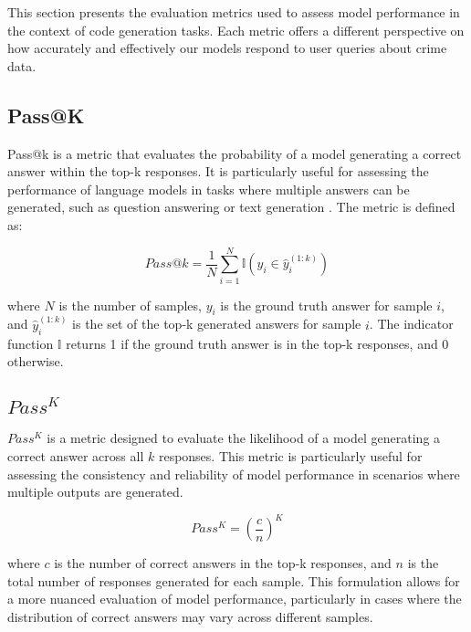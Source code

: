 This section presents the evaluation metrics used to assess model performance in the context of code generation tasks. Each metric offers a different perspective on how accurately and effectively our models respond to user queries about crime data.

\subsection{Pass@K}

Pass@k is a metric that evaluates the probability of a model generating a correct answer within the top-k responses. It is particularly useful for assessing the performance of language models in tasks where multiple answers can be generated, such as question answering or text generation \citep{Levi2024SimpleModelInferenceScalingLaws}. The metric is defined as:

\begin{equation}
    Pass@k = \frac{1}{N} \sum_{i=1}^{N} \mathbb{I}(y_i \in \hat{y}_i^{(1:k)})
\end{equation}

where \(N\) is the number of samples, \(y_i\) is the ground truth answer for sample \(i\), and \(\hat{y}_i^{(1:k)}\) is the set of the top-k generated answers for sample \(i\). The indicator function \(\mathbb{I}\) returns 1 if the ground truth answer is in the top-k responses, and 0 otherwise.


\subsection{$Pass^K$}

$Pass^K$ is a metric designed to evaluate the likelihood of a model generating a correct answer across all \(k\) responses. This metric is particularly useful for assessing the consistency and reliability of model performance in scenarios where multiple outputs are generated.

\begin{equation}
    Pass^{K} = (\frac{c}{n})^{K}
\end{equation}

where \(c\) is the number of correct answers in the top-k responses, and \(n\) is the total number of responses generated for each sample. This formulation allows for a more nuanced evaluation of model performance, particularly in cases where the distribution of correct answers may vary across different samples.


